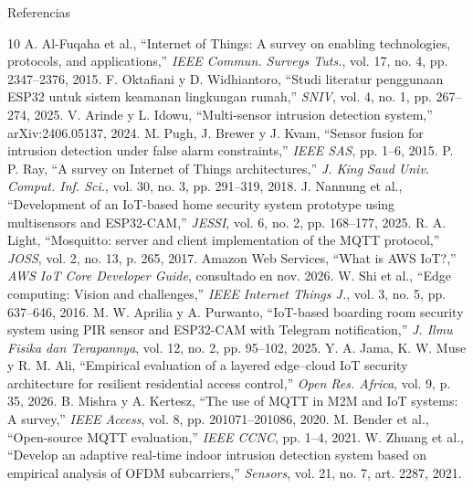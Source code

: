 \documentclass[aspectratio=169,10pt]{beamer}
\begin{document}
\begin{frame}{Referencias}
  \tiny
  \begin{thebibliography}{10}
   A. Al-Fuqaha et al., ``Internet of Things: A survey on enabling technologies, protocols, and applications,'' \emph{IEEE Commun. Surveys Tuts.}, vol. 17, no. 4, pp. 2347--2376, 2015.
   F. Oktafiani y D. Widhiantoro, ``Studi literatur penggunaan ESP32 untuk sistem keamanan lingkungan rumah,'' \emph{SNIV}, vol. 4, no. 1, pp. 267--274, 2025.
   V. Arinde y L. Idowu, ``Multi-sensor intrusion detection system,'' arXiv:2406.05137, 2024.
   M. Pugh, J. Brewer y J. Kvam, ``Sensor fusion for intrusion detection under false alarm constraints,'' \emph{IEEE SAS}, pp. 1--6, 2015.
   P. P. Ray, ``A survey on Internet of Things architectures,'' \emph{J. King Saud Univ. Comput. Inf. Sci.}, vol. 30, no. 3, pp. 291--319, 2018.
   J. Nannung et al., ``Development of an IoT-based home security system prototype using multisensors and ESP32-CAM,'' \emph{JESSI}, vol. 6, no. 2, pp. 168--177, 2025.
   R. A. Light, ``Mosquitto: server and client implementation of the MQTT protocol,'' \emph{JOSS}, vol. 2, no. 13, p. 265, 2017.
   Amazon Web Services, ``What is AWS IoT?,'' \emph{AWS IoT Core Developer Guide}, consultado en nov. 2026.
   W. Shi et al., ``Edge computing: Vision and challenges,'' \emph{IEEE Internet Things J.}, vol. 3, no. 5, pp. 637--646, 2016.
   M. W. Aprilia y A. Purwanto, ``IoT-based boarding room security system using PIR sensor and ESP32-CAM with Telegram notification,'' \emph{J. Ilmu Fisika dan Terapannya}, vol. 12, no. 2, pp. 95--102, 2025.
   Y. A. Jama, K. W. Muse y R. M. Ali, ``Empirical evaluation of a layered edge--cloud IoT security architecture for resilient residential access control,'' \emph{Open Res. Africa}, vol. 9, p. 35, 2026.
   B. Mishra y A. Kertesz, ``The use of MQTT in M2M and IoT systems: A survey,'' \emph{IEEE Access}, vol. 8, pp. 201071--201086, 2020.
   M. Bender et al., ``Open-source MQTT evaluation,'' \emph{IEEE CCNC}, pp. 1--4, 2021.
   W. Zhuang et al., ``Develop an adaptive real-time indoor intrusion detection system based on empirical analysis of OFDM subcarriers,'' \emph{Sensors}, vol. 21, no. 7, art. 2287, 2021.
  \end{thebibliography}
\end{frame}
\end{document}
